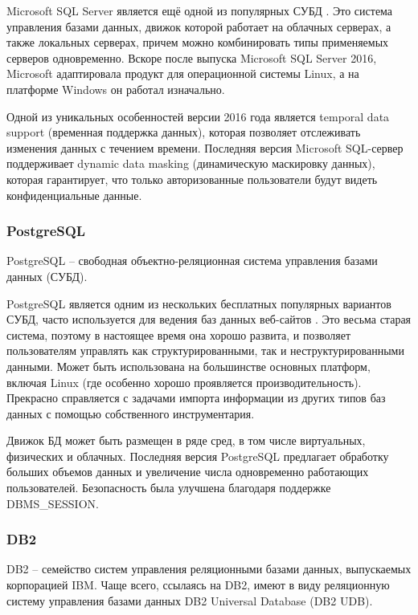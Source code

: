 \documentclass[a4paper,14pt]{extreport}
\begin{document}
Microsoft SQL Server является ещё одной из популярных СУБД \cite{cmp_db}. Это система управления базами данных, движок которой работает на облачных серверах, а также локальных серверах, причем можно комбинировать типы применяемых серверов одновременно. Вскоре после выпуска Microsoft SQL Server 2016, Microsoft адаптировала продукт для операционной системы Linux, а на платформе Windows он работал изначально.

Одной из уникальных особенностей версии 2016 года является temporal data support (временная поддержка данных), которая позволяет отслеживать изменения данных с течением времени. Последняя версия Microsoft SQL-сервер поддерживает dynamic data masking (динамическую маскировку данных), которая гарантирует, что только авторизованные пользователи будут видеть конфиденциальные данные.

\subsubsection*{PostgreSQL}

PostgreSQL \cite{pg} -- свободная объектно-реляционная система управления базами данных (СУБД).

PostgreSQL является одним из нескольких бесплатных популярных вариантов СУБД, часто используется для ведения баз данных веб-сайтов \cite{cmp_db}. Это весьма старая система, поэтому в настоящее время она хорошо развита, и позволяет пользователям управлять как структурированными, так и неструктурированными данными. Может быть использована на большинстве основных платформ, включая Linux (где особенно хорошо проявляется производительность). Прекрасно справляется с задачами импорта информации из других типов баз данных с помощью собственного инструментария.

Движок БД может быть размещен в ряде сред, в том числе виртуальных, физических и облачных. Последняя версия PostgreSQL предлагает обработку больших объемов данных и увеличение числа одновременно работающих пользователей. Безопасность была улучшена благодаря поддержке DBMS\_SESSION.

\subsubsection*{DB2}

DB2 \cite{db2} -- семейство систем управления реляционными базами данных, выпускаемых корпорацией IBM. Чаще всего, ссылаясь на DB2, имеют в виду реляционную систему управления базами данных DB2 Universal Database (DB2 UDB).
\end{document}
